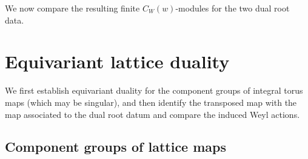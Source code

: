 \documentclass[11pt,a4paper,reqno]{amsart}
\theoremstyle{plain}
\theoremstyle{definition}
\theoremstyle{remark}
\numberwithin{equation}{section}
\begin{document}
We now compare the resulting finite $C_W(w)$-modules for the two dual root data.

\section{Equivariant lattice duality}\label{sec:lattice}

We first establish equivariant duality for the component groups of integral torus maps (which may be singular), and then identify the transposed map with the map associated to the dual root datum and compare the induced Weyl actions.

\subsection{Component groups of lattice maps}
\end{document}
